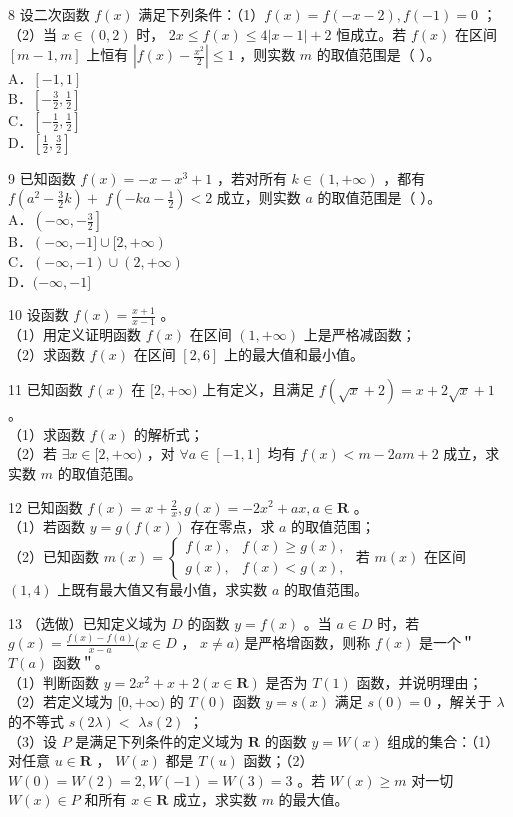 \documentclass[10pt]{article}
\begin{document}
8 设二次函数 \(f(x)\) 满足下列条件：（1）\(f(x)=f(-x-2), f(-1)=0\) ；（2）当 \(x \in(0,2)\) 时， \(2 x \leqslant f(x) \leqslant 4|x-1|+2\) 恒成立。若 \(f(x)\) 在区间 \([m-1, m]\) 上恒有 \(\left|f(x)-\frac{x^{2}}{2}\right| \leqslant 1\) ，则实数 \(m\) 的取值范围是（ ）。\\
A．\([-1,1]\)\\
B．\(\left[-\frac{3}{2}, \frac{1}{2}\right]\)\\
C．\(\left[-\frac{1}{2}, \frac{1}{2}\right]\)\\
D．\(\left[\frac{1}{2}, \frac{3}{2}\right]\)

9 已知函数 \(f(x)=-x-x^{3}+1\) ，若对所有 \(k \in(1,+\infty)\) ，都有 \(f\left(a^{2}-\frac{3}{2} k\right)+\) \(f\left(-k a-\frac{1}{2}\right)<2\) 成立，则实数 \(a\) 的取值范围是（ ）。\\
A．\(\left(-\infty,-\frac{3}{2}\right]\)\\
B．\((-\infty,-1] \cup[2,+\infty)\)\\
C．\((-\infty,-1) \cup(2,+\infty)\)\\
D．\((-\infty,-1]\)

10 设函数 \(f(x)=\frac{x+1}{x-1}\) 。\\
（1）用定义证明函数 \(f(x)\) 在区间 \((1,+\infty)\) 上是严格减函数；\\
（2）求函数 \(f(x)\) 在区间 \([2,6]\) 上的最大值和最小值。

11 已知函数 \(f(x)\) 在 \([2,+\infty)\) 上有定义，且满足 \(f(\sqrt{x}+2)=x+2 \sqrt{x}+1\) 。\\
（1）求函数 \(f(x)\) 的解析式；\\
（2）若 \(\exists x \in[2,+\infty)\) ，对 \(\forall a \in[-1,1]\) 均有 \(f(x)<m-2 a m+2\) 成立，求实数 \(m\) 的取值范围。

12 已知函数 \(f(x)=x+\frac{2}{x}, g(x)=-2 x^{2}+a x, a \in \mathbf{R}\) 。\\
（1）若函数 \(y=g(f(x))\) 存在零点，求 \(a\) 的取值范围；\\
（2）已知函数 \(m(x)=\left\{\begin{array}{ll}f(x), & f(x) \geqslant g(x), \\ g(x), & f(x)<g(x),\end{array}\right.\) 若 \(m(x)\) 在区间 \((1,4)\) 上既有最大值又有最小值，求实数 \(a\) 的取值范围。

13 （选做）已知定义域为 \(D\) 的函数 \(y=f(x)\) 。当 \(a \in D\) 时，若 \(g(x)=\frac{f(x)-f(a)}{x-a}(x \in D\) ， \(x \neq a)\) 是严格增函数，则称 \(f(x)\) 是一个＂\(T(a)\) 函数＂。\\
（1）判断函数 \(y=2 x^{2}+x+2(x \in \mathbf{R})\) 是否为 \(T(1)\) 函数，并说明理由；\\
（2）若定义域为 \([0,+\infty)\) 的 \(T(0)\) 函数 \(y=s(x)\) 满足 \(s(0)=0\) ，解关于 \(\lambda\) 的不等式 \(s(2 \lambda)<\) \(\lambda s(2)\) ；\\
（3）设 \(P\) 是满足下列条件的定义域为 \(\mathbf{R}\) 的函数 \(y=W(x)\) 组成的集合：（1）对任意 \(u \in \mathbf{R}\) ， \(W(x)\) 都是 \(T(u)\) 函数；（2）\(W(0)=W(2)=2, W(-1)=W(3)=3\) 。若 \(W(x) \geqslant m\) 对一切 \(W(x) \in P\) 和所有 \(x \in \mathbf{R}\) 成立，求实数 \(m\) 的最大值。
\end{document}
